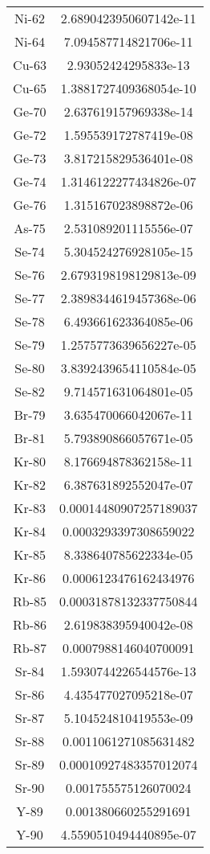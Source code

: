 \begin{table}[h!]
\begin{tabular}{|| c || c |}
Ni-62 & 2.6890423950607142e-11 \\
Ni-64 & 7.094587714821706e-11 \\
Cu-63 & 2.93052424295833e-13 \\
Cu-65 & 1.3881727409368054e-10 \\
Ge-70 & 2.637619157969338e-14 \\
Ge-72 & 1.595539172787419e-08 \\
Ge-73 & 3.817215829536401e-08 \\
Ge-74 & 1.3146122277434826e-07 \\
Ge-76 & 1.315167023898872e-06 \\
As-75 & 2.531089201115556e-07 \\
Se-74 & 5.304524276928105e-15 \\
Se-76 & 2.6793198198129813e-09 \\
Se-77 & 2.3898344619457368e-06 \\
Se-78 & 6.493661623364085e-06 \\
Se-79 & 1.2575773639656227e-05 \\
Se-80 & 3.8392439654110584e-05 \\
Se-82 & 9.714571631064801e-05 \\
Br-79 & 3.635470066042067e-11 \\
Br-81 & 5.793890866057671e-05 \\
Kr-80 & 8.176694878362158e-11 \\
Kr-82 & 6.387631892552047e-07 \\
Kr-83 & 0.00014480907257189037 \\
Kr-84 & 0.0003293397308659022 \\
Kr-85 & 8.338640785622334e-05 \\
Kr-86 & 0.0006123476162434976 \\
Rb-85 & 0.00031878132337750844 \\
Rb-86 & 2.619838395940042e-08 \\
Rb-87 & 0.0007988146040700091 \\
Sr-84 & 1.5930744226544576e-13 \\
Sr-86 & 4.435477027095218e-07 \\
Sr-87 & 5.104524810419553e-09 \\
Sr-88 & 0.0011061271085631482 \\
Sr-89 & 0.00010927483357012074 \\
Sr-90 & 0.001755575126070024 \\
Y-89 & 0.001380660255291691 \\
Y-90 & 4.5590510494440895e-07 \\

\end{tabular}
\end{table}
